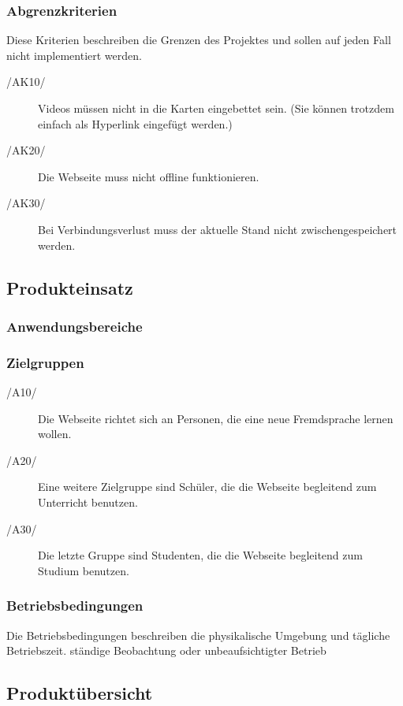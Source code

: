\subsubsection{Abgrenzkriterien}
Diese Kriterien beschreiben die Grenzen des Projektes und sollen auf jeden Fall nicht implementiert werden.
\begin{description}
	\item[/AK10/] Videos müssen nicht in die Karten eingebettet sein. (Sie können trotzdem einfach als Hyperlink eingefügt werden.)
	\item[/AK20/] Die Webseite muss nicht offline funktionieren.
	\item[/AK30/] Bei Verbindungsverlust muss der aktuelle Stand nicht zwischengespeichert werden.
\end{description}

\subsection{Produkteinsatz}

\subsubsection{Anwendungsbereiche}

\subsubsection{Zielgruppen}
\begin{description}
	\item[/A10/] Die Webseite richtet sich an Personen, die eine neue Fremdsprache lernen wollen.
	\item[/A20/] Eine weitere Zielgruppe sind Schüler, die die Webseite begleitend zum Unterricht benutzen.
	\item[/A30/] Die letzte Gruppe sind Studenten, die die Webseite begleitend zum Studium benutzen.
\end{description}

\subsubsection{Betriebsbedingungen}
Die Betriebsbedingungen beschreiben die physikalische Umgebung und tägliche Betriebszeit. ständige Beobachtung oder unbeaufsichtigter Betrieb

\subsection{Produktübersicht}

